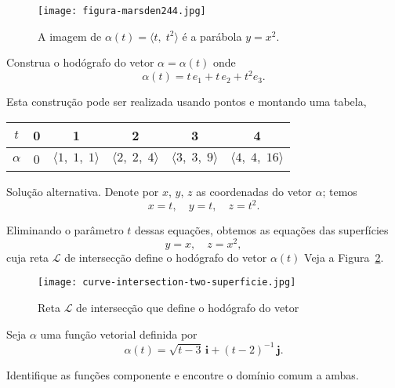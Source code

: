 \begin{figure}[H]
  \centering
  \texttt{[image: figura-marsden244.jpg]}
  \caption{A imagem de \(\alpha(t) =\langle t,\; t^{2}\rangle \) é a parábola \(y = x^{2}\).}\label{fig:164}
\end{figure}


\begin{exc}
Construa o hodógrafo do vetor \(\alpha=\alpha(t)\) onde 
\begin{equation*}
	\alpha(t) = t\,e_{1}+ t\,e_{2} + t^{2}e_{3}.
\end{equation*}
\end{exc}

\solo
Esta construção pode ser realizada usando pontos e montando uma tabela,
\begin{table}[H]
	\centering
	\begin{tabular}{cccccc}
		\toprule[2pt]
	\(t\)	& 0  & 1 &2  &3  &4  \\
		\midrule
	\(\alpha\)	& 0 & \(\langle 1,\; 1,\; 1 \rangle\) & \(\langle 2,\; 2,\; 4 \rangle\)  & \(\langle 3,\; 3,\; 9 \rangle\) & \(\langle 4,\; 4,\; 16 \rangle\) \\
		\bottomrule[2pt]
	\end{tabular}
\end{table}


Solução alternativa. Denote por \(x\), \(y\), \(z\) as coordenadas do vetor 
\(\alpha\); temos
\begin{equation*}
	x = t,\quad  y = t,\quad  z=t^{2}.
\end{equation*}

Eliminando o parâmetro \(t\) dessas equações, obtemos as equações das superfícies 
\begin{equation*}
	y = x, \quad  z = x^{2}, 
\end{equation*}
cuja reta \(\mathcal{L}\) de intersecção define o hodógrafo do vetor \(\alpha(t)\) Veja a Figura~\ref{fig:1-4}.
\begin{figure}[H]
\centering
\texttt{[image: curve-intersection-two-superficie.jpg]}
\caption{Reta \(\mathcal{L}\) de intersecção que define o hodógrafo do vetor}
\label{fig:1-4}
\end{figure}


\begin{exc}\label{exer:5-01}
Seja \(\alpha\) uma função vetorial definida por
\begin{equation*}
\alpha(t)=\sqrt{t-3}\,\boldsymbol{i}+(t-2)^{-1}\, \boldsymbol{j}.
\end{equation*}

Identifique as funções componente e encontre o domínio comum a ambas.
\end{exc}

